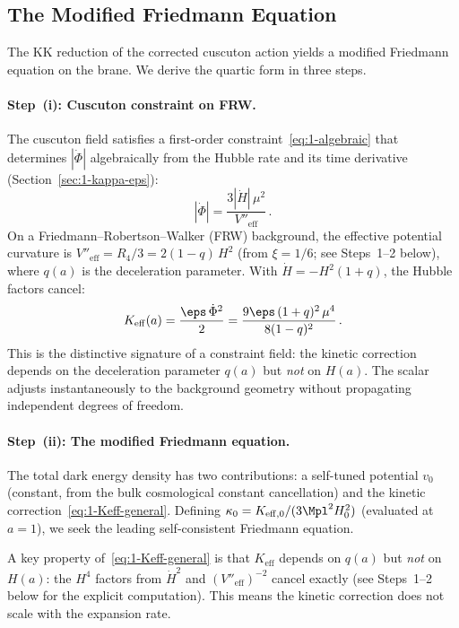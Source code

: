 \subsection{The Modified Friedmann Equation}
\label{sec:1-friedmann}

The KK reduction of the corrected cuscuton action yields a modified Friedmann equation on the brane. We derive the quartic form in three steps.

\paragraph{Step~(i): Cuscuton constraint on FRW.} The cuscuton field satisfies a first-order constraint~\eqref{eq:1-algebraic} that determines $|\dot\Phi|$ algebraically from the Hubble rate and its time derivative (Section~\ref{sec:1-kappa-eps}):
\begin{equation}
\label{eq:1-phidot-quartic}
|\dot\Phi| = \frac{3|\dot{H}|\,\mu^2}{V''_{\mathrm{eff}}}\,.
\end{equation}
On a Friedmann--Robertson--Walker (FRW) background, the effective potential curvature is $V''_{\mathrm{eff}} = R_4/3 = 2(1 - q)\,H^2$ (from $\xi = 1/6$; see Steps~1--2 below), where $q(a)$ is the deceleration parameter. With $\dot{H} = -H^2(1+q)$, the Hubble factors cancel:
\begin{equation}
\label{eq:1-Keff-general}
K_{\mathrm{eff}}(a) = \frac{\eps\,\dot\Phi^2}{2}
= \frac{9\eps\,(1+q)^2\,\mu^4}{8(1-q)^2}\,.
\end{equation}
This is the distinctive signature of a constraint field: the kinetic correction depends on the deceleration parameter $q(a)$ but \emph{not} on $H(a)$. The scalar adjusts instantaneously to the background geometry without propagating independent degrees of freedom.

\paragraph{Step~(ii): The modified Friedmann equation.} The total dark energy density has two contributions: a self-tuned potential $v_0$ (constant, from the bulk cosmological constant cancellation) and the kinetic correction~\eqref{eq:1-Keff-general}. Defining $\kappa_0 = K_{\mathrm{eff},0}/(3\Mpl^2 H_0^2)$ (evaluated at $a = 1$), we seek the leading self-consistent Friedmann equation.

A key property of~\eqref{eq:1-Keff-general} is that $K_{\mathrm{eff}}$ depends on $q(a)$ but \emph{not} on $H(a)$: the $H^4$ factors from $\dot{H}^2$ and $(V''_{\mathrm{eff}})^{-2}$ cancel exactly (see Steps~1--2 below for the explicit computation). This means the kinetic correction does not scale with the expansion rate.

